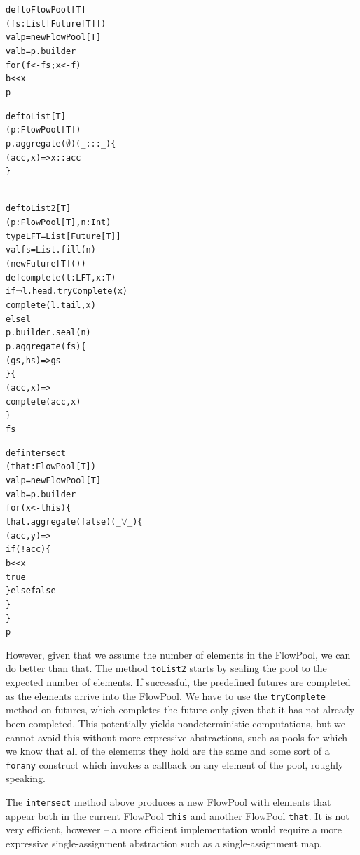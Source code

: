 \documentclass[runningheads,a4paper]{llncs}
\begin{document}
\noindent
\begin{minipage}[b]{3.6 cm}
\begin{alltt}
{\scriptsize
def toFlowPool[T]
  (fs: List[Future[T]])
  val p = new FlowPool[T]
  val b = p.builder
  for (f <- fs; x <- f)
    b << x
  p


def toList[T]
  (p: FlowPool[T])
  p.aggregate(\(\emptyset\))(_ ::: _) \{
    (acc, x) => x :: acc
  \}



}
\end{alltt}
\end{minipage}
\begin{minipage}[b]{3.9 cm}
\begin{alltt}
{\scriptsize
def toList2[T]
  (p: FlowPool[T], n: Int)
  type LFT = List[Future[T]]
  val fs = List.fill(n)
    (new Future[T]())
  def complete(l: LFT, x: T)
    if \(\lnot\)l.head.tryComplete(x)
      complete(l.tail, x)
    else l
  p.builder.seal(n)
  p.aggregate(fs) \{
    (gs, hs) => gs
  \} \{
    (acc, x) =>
    complete(acc, x)
  \}
  fs
}
\end{alltt}
\end{minipage}
\begin{minipage}[b]{4.7 cm}
\begin{alltt}
{\scriptsize
def intersect
  (that: FlowPool[T])
  val p = new FlowPool[T]
  val b = p.builder
  for (x <- this) \{
    that.aggregate(false)(_ \(\vee\) _) \{
      (acc, y) =>
      if (!acc) \{
        b << x
        true
      \} else false
    \}
  \}
  p



}
\end{alltt}
\end{minipage}


However, given that we assume the number of elements in
the FlowPool, we can do better than that.
The method \verb=toList2= starts by sealing the pool to
the expected number of elements.
If successful, the predefined futures are completed
as the elements arrive into the FlowPool.
We have to use the \verb=tryComplete= method on
futures, which completes the future only given that
it has not already been completed.
This potentially yields nondeterministic computations,
but we cannot avoid this without more expressive
abstractions, such as pools for which we know that
all of the elements they hold are the same and some
sort of a \verb=forany= construct which invokes a callback
on any element of the pool, roughly speaking.

The \verb=intersect= method above produces a new FlowPool with
elements that appear both in the current FlowPool \verb=this=
and another FlowPool \verb=that=.
It is not very efficient, however -- a more efficient implementation
would require a more expressive single-assignment abstraction such
as a single-assignment map.
\end{document}
